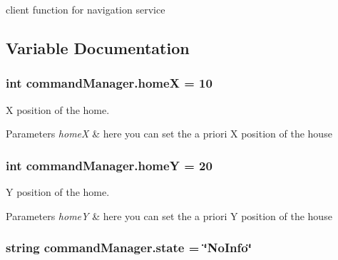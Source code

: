 client function for navigation service 



\subsection{Variable Documentation}
\subsubsection[{\texorpdfstring{homeX}{homeX}}]{\setlength{\rightskip}{0pt plus 5cm}int command\+Manager.\+homeX = 10}\hypertarget{namespacecommandManager_afd4e45cbe13ed5ee1c795062ed21e184}{}\label{namespacecommandManager_afd4e45cbe13ed5ee1c795062ed21e184}


X position of the home. 


\begin{DoxyParams}{Parameters}
{\em homeX} & here you can set the a priori X position of the house \\
\hline
\end{DoxyParams}
\subsubsection[{\texorpdfstring{homeY}{homeY}}]{\setlength{\rightskip}{0pt plus 5cm}int command\+Manager.\+homeY = 20}\hypertarget{namespacecommandManager_a9deb4aa18f5f193991dbfb07d1f8e0b3}{}\label{namespacecommandManager_a9deb4aa18f5f193991dbfb07d1f8e0b3}


Y position of the home. 


\begin{DoxyParams}{Parameters}
{\em homeY} & here you can set the a priori Y position of the house \\
\hline
\end{DoxyParams}
\subsubsection[{\texorpdfstring{state}{state}}]{\setlength{\rightskip}{0pt plus 5cm}string command\+Manager.\+state = \char`\"{}No\+Info\char`\"{}}\hypertarget{namespacecommandManager_ad20ad550a7350517b8e1ce3dc95e3347}{}\label{namespacecommandManager_ad20ad550a7350517b8e1ce3dc95e3347}


